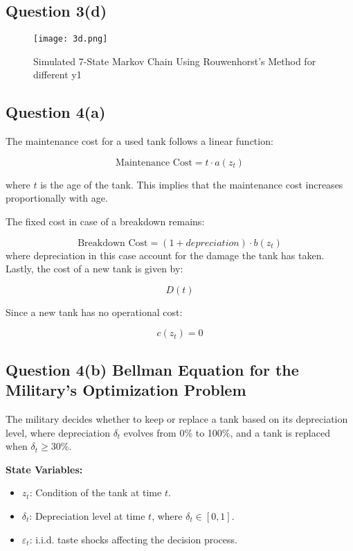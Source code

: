 \documentclass{article}
\begin{document}
\subsection*{Question 3(d)}
\begin{figure}[H]
    \centering
    \texttt{[image: 3d.png]}
    \caption{Simulated 7-State Markov Chain Using Rouwenhorst's Method for different y1}
    \label{fig:3d}
\end{figure}

\subsection*{Question 4(a)}

The maintenance cost for a used tank follows a linear function:

\[
\text{Maintenance Cost} = t \cdot a(z_t)
\]

where \( t \) is the age of the tank. This implies that the maintenance cost increases proportionally with age.

The fixed cost in case of a breakdown remains:

\[
\text{Breakdown Cost} = (1 + depreciation) \cdot b(z_t)
\]
where depreciation in this case account for the damage the tank has taken.
Lastly, the cost of a new tank is given by:

\[
D(t)
\]

Since a new tank has no operational cost:

\[
c(z_t) = 0
\]

\subsection*{Question 4(b) Bellman Equation for the Military's Optimization Problem}

The military decides whether to keep or replace a tank based on its depreciation level, where depreciation \(\delta_t\) evolves from 0\% to 100\%, and a tank is replaced when \(\delta_t \geq 30\%\).

\textbf{State Variables:}
\begin{itemize}
    \item \( z_t \): Condition of the tank at time \( t \).
    \item \( \delta_t \): Depreciation level at time \( t \), where \( \delta_t \in [0,1] \).
    \item \( \varepsilon_t \): i.i.d. taste shocks affecting the decision process.
\end{itemize}
\end{document}
